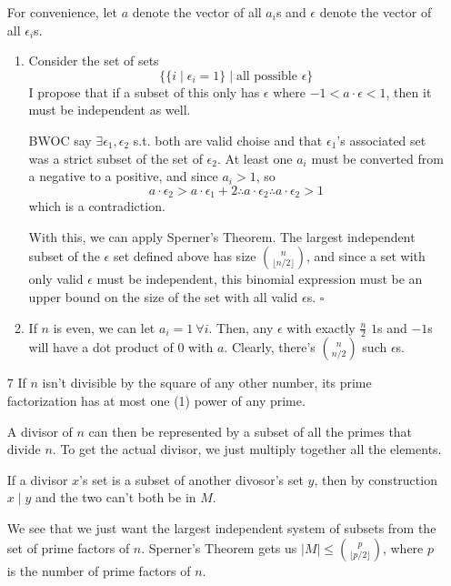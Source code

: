\documentclass[12pt]{article}
\begin{document}
\begin{enumerate}
        For convenience, let $a$ denote the vector of all $a_i$s and $\epsilon$ denote
        the vector of all $\epsilon_i$s.
        \begin{enumerate}
            \item Consider the set of sets
                  \[\{\{i \mid \epsilon_i=1\} \mid \text{all possible $\epsilon$}\}\]
                  I propose that if a subset of this only has $\epsilon$ where $-1 < a \cdot \epsilon < 1$,
                  then it must be independent as well.

                  BWOC say $\exists \epsilon_1, \epsilon_2$ s.t.
                  both are valid choise and that $\epsilon_1$'s associated set
                  was a strict subset of the set of $\epsilon_2$.
                  At least one $a_i$ must be converted from a negative to a positive,
                  and since $a_i > 1$, so
                  \[a \cdot \epsilon_2 > a \cdot \epsilon_1 + 2 \therefore a \cdot \epsilon_2 \therefore a \cdot \epsilon_2 > 1\]
                  which is a contradiction.

                  With this, we can apply Sperner's Theorem.
                  The largest independent subset of the $\epsilon$ set defined above
                  has size $\binom{n}{\lfloor n/2 \rfloor}$, and since
                  a set with only valid $\epsilon$ must be independent,
                  this binomial expression must be an upper bound on the size
                  of the set with all valid $\epsilon$s. $\square$

            \item If $n$ is even, we can let $a_i=1\ \forall i$.
                  Then, any $\epsilon$ with exactly $\frac{n}{2}$ $1$s and $-1$s
                  will have a dot product of $0$ with $a$.
                  Clearly, there's $\binom{n}{n/2}$ such $\epsilon$s.
        \end{enumerate}

    \item[7] If $n$ isn't divisible by the square of any other number,
        its prime factorization has at most one (1) power of any prime.

        A divisor of $n$ can then be represented by a subset of all the primes that divide $n$.
        To get the actual divisor, we just multiply together all the elements.

        If a divisor $x$'s set is a subset of another divosor's set $y$,
        then by construction $x \mid y$ and the two can't both be in $M$.

        We see that we just want the largest independent system of subsets
        from the set of prime factors of $n$.
        Sperner's Theorem gets us $\boxed{|M| \le \binom{p}{\lfloor p/2 \rfloor}}$,
        where $p$ is the number of prime factors of $n$.
\end{enumerate}
\end{document}

